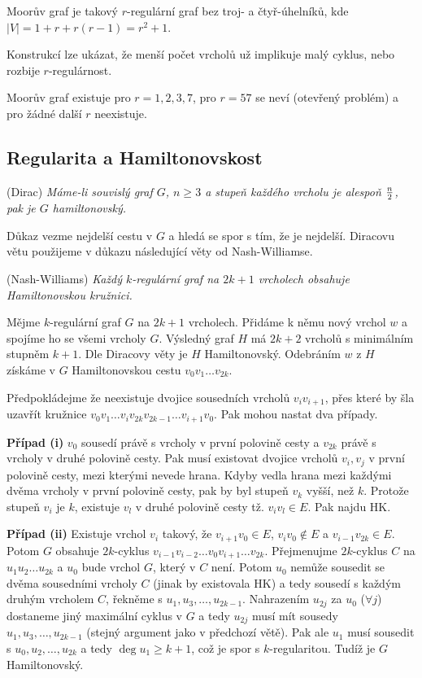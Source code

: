 \df Moorův graf je takový $r$-regulární graf bez troj- a čtyř-úhelníků, kde $|V| = 1 + r + r(r-1) = r^2 + 1$.

Konstrukcí lze ukázat, že menší počet vrcholů už implikuje malý cyklus, nebo rozbije $r$-regulárnost.

\vt Moorův graf existuje pro $r=1,2,3,7$, pro $r=57$ se neví (otevřený problém) a pro žádné další $r$ neexistuje.

\subsection{Regularita a Hamiltonovskost}
\vt (Dirac) {\it Máme-li souvislý graf $G$, $n \ge 3$ a stupeň každého vrcholu je alespoň $n\over 2$, pak je $G$ hamiltonovský.} 

Důkaz vezme nejdelší cestu v $G$ a hledá se spor s tím, že je nejdelší. Diracovu větu použijeme v důkazu následující věty od Nash-Williamse. 

\vt (Nash-Williams) {\it Každý $k$-regulární graf na $2k+1$ vrcholech obsahuje Hamiltonovskou kružnici.}

\dk Mějme $k$-regulární graf $G$ na $2k+1$ vrcholech. Přidáme k němu nový vrchol $w$ a spojíme ho se všemi vrcholy $G$. Výsledný graf $H$ má $2k+2$ vrcholů s minimálním stupněm $k+1$. Dle Diracovy věty je $H$ Hamiltonovský. Odebráním $w$ z $H$ získáme v $G$ Hamiltonovskou cestu $v_0v_1\dots v_{2k}$.

Předpokládejme že neexistuje dvojice sousedních vrcholů $v_iv_{i+1}$, přes které by šla uzavřít kružnice $v_0v_1\dots v_iv_{2k}v_{2k-1}\dots v_{i+1}v_0$. Pak mohou nastat dva případy.

\textbf{Případ (i)} $v_0$ sousedí právě s vrcholy v první polovině cesty a $v_{2k}$ právě s vrcholy v druhé polovině cesty. Pak musí existovat dvojice vrcholů $v_i,v_j$ v první polovině cesty, mezi kterými nevede hrana. Kdyby vedla hrana mezi každými dvěma vrcholy v první polovině cesty, pak by byl stupeň $v_k$ vyšší, než $k$. Protože stupeň $v_i$ je $k$, existuje $v_l$ v druhé polovině cesty tž. $v_iv_l \in E$. Pak najdu HK.

\textbf{Případ (ii)} Existuje vrchol $v_i$ takový, že $v_{i+1}v_0 \in E$, $v_iv_0 \not\in E$ a $v_{i-1}v_{2k} \in E$. Potom $G$ obsahuje $2k$-cyklus $v_{i-1}v_{i-2}\dots v_0v_{i+1}\dots v_{2k}$. Přejmenujme $2k$-cyklus $C$ na $u_1u_2\dots u_{2k}$ a $u_0$ bude vrchol $G$, který v $C$ není. Potom $u_0$ nemůže sousedit se dvěma sousedními vrcholy $C$ (jinak by existovala HK) a tedy sousedí s každým druhým vrcholem $C$, řekněme s $u_1, u_3, \dots, u_{2k-1}$. Nahrazením $u_{2j}$ za $u_0$ ($\forall j$) dostaneme jiný maximální cyklus v $G$ a tedy $u_{2j}$ musí mít sousedy $u_1, u_3, \dots, u_{2k-1}$ (stejný argument jako v předchozí větě). Pak ale $u_1$ musí sousedit s $u_0, u_2, \dots, u_{2k}$ a tedy $\deg u_1 \ge k+1$, což je spor s $k$-regularitou. Tudíž je $G$ Hamiltonovský.

